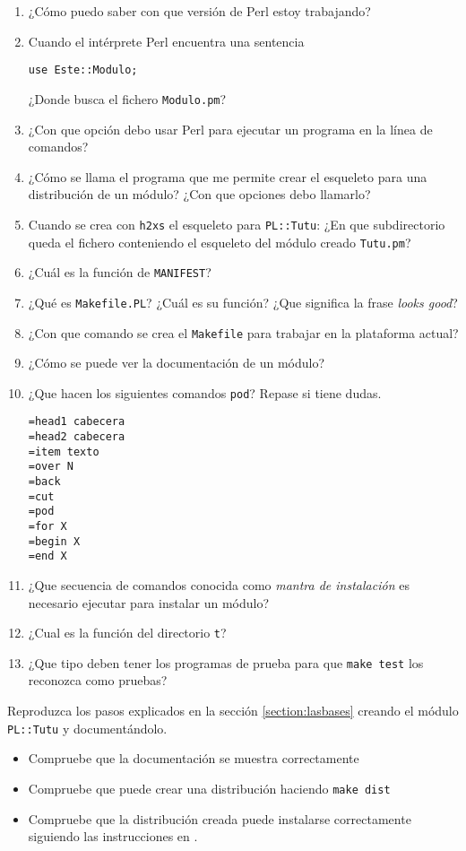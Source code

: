 \begin{enumerate}
\item
¿Cómo puedo saber con que versión de Perl estoy trabajando?
\item
Cuando el intérprete Perl encuentra una sentencia 
\begin{verbatim}
use Este::Modulo;
\end{verbatim}
¿Donde busca el fichero \verb|Modulo.pm|?
\item
¿Con que opción debo usar Perl para ejecutar un programa en la línea de comandos?
\item
¿Cómo se llama el programa que me permite crear el esqueleto 
para una distribución de un módulo? ¿Con que opciones debo llamarlo?
\item
Cuando se crea con \verb|h2xs| el esqueleto para \verb|PL::Tutu|:
¿En que subdirectorio queda el fichero conteniendo el esqueleto del
módulo creado \verb|Tutu.pm|?
\item
¿Cuál es la función de \verb|MANIFEST|?
\item
¿Qué es \verb|Makefile.PL|? ¿Cuál es su función?
¿Que significa la frase \emph{looks good}?
\item
¿Con que comando se crea el \verb|Makefile| para trabajar en la plataforma
actual?
\item
¿Cómo se puede ver la documentación de un módulo?
\item 
¿Que hacen los siguientes comandos \verb|pod|?
Repase 
si tiene dudas.
\begin{verbatim}
=head1 cabecera 
=head2 cabecera 
=item texto
=over N
=back
=cut
=pod
=for X
=begin X
=end X
\end{verbatim}
\item
¿Que secuencia de comandos conocida como
\emph{mantra de instalación} es necesario ejecutar para 
instalar un módulo?
\item
¿Cual es la función del directorio \verb|t|?
\item
¿Que tipo deben tener los programas de prueba para que
\verb|make test| los reconozca como pruebas?

\end{enumerate}

\label{practica:creacionydocdemodulo}
Reproduzca los pasos explicados en la sección 
\ref{section:lasbases} creando el módulo {\tt PL::Tutu}
y documentándolo. 
\begin{itemize}
\item
Compruebe que la documentación se muestra correctamente
\item
Compruebe que puede crear una distribución haciendo \verb|make dist|
\item
Compruebe que la distribución creada puede instalarse correctamente
siguiendo las instrucciones en 
.
\end{itemize}

